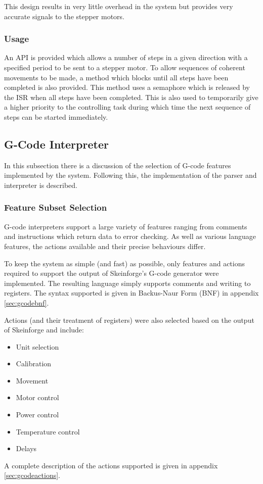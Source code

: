 				This design results in very little overhead in the system but provides
				very accurate signals to the stepper motors.
			
			\subsubsection{Usage}
				
				An API is provided which allows a number of steps in a given direction
				with a specified period to be sent to a stepper motor. To allow
				sequences of coherent movements to be made, a method which blocks until
				all steps have been completed is also provided. This method uses a
				semaphore which is released by the ISR when all steps have been
				completed. This is also used to temporarily give a higher priority to
				the controlling task during which time the next sequence of steps
				can be started immediately.
		
		\subsection{G-Code Interpreter}
			
			In this subsection there is a discussion of the selection of G-code
			features implemented by the system. Following this, the implementation of
			the parser and interpreter is described.
			
			\subsubsection{Feature Subset Selection}
				
				G-code interpreters support a large variety of features ranging from
				comments and instructions which return data to error checking. As well
				as various language features, the actions available and their precise
				behaviours differ.
				
				To keep the system as simple (and fast) as possible, only features and
				actions required to support the output of Skeinforge's G-code generator
				were implemented.  The resulting language simply supports comments and
				writing to registers.  The syntax supported is given in Backus-Naur Form
				(BNF) in appendix \ref{sec:gcodebnf}.
				
				Actions (and their treatment of registers) were also selected based on the
				output of Skeinforge and include:
				\begin{itemize}
					\item Unit selection
					\item Calibration
					\item Movement
					\item Motor control
					\item Power control
					\item Temperature control
					\item Delays
				\end{itemize}
				A complete description of the actions supported is given in appendix
				\ref{sec:gcodeactions}.
			
